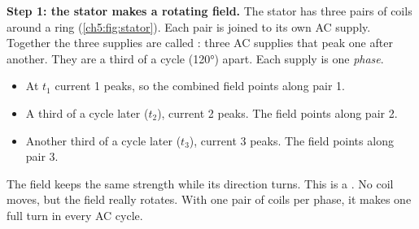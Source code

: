 \textbf{Step 1: the stator makes a rotating field.} The stator has three pairs of coils
around a ring (\cref{ch5:fig:stator}). Each pair is joined to its own AC supply.
Together the three supplies are called : three AC supplies that
peak one after another. They are a third of a cycle (\ang{120}) apart. Each supply is
one \emph{phase}.
\begin{itemize}
  \item At $t_1$ current 1 peaks, so the combined field points along pair 1.
  \item A third of a cycle later ($t_2$), current 2 peaks. The field points along pair 2.
  \item Another third of a cycle later ($t_3$), current 3 peaks. The field points along
        pair 3.
\end{itemize}
The field keeps the same strength while its direction turns. This is a
. No coil moves, but the field really rotates. With one
pair of coils per phase, it makes one full turn in every AC cycle.


